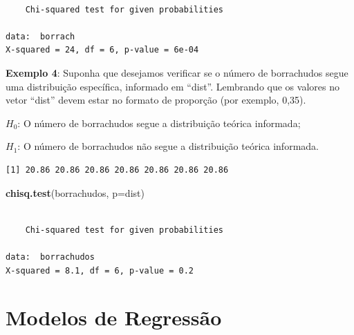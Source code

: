 \documentclass[12pt,brazil,oneside]{book}
\newenvironment{Shaded}{\begin{snugshade}}{\end{snugshade}}
\newcommand{\DataTypeTok}[1]{\textcolor[rgb]{0.13,0.29,0.53}{#1}}
\newcommand{\DecValTok}[1]{\textcolor[rgb]{0.00,0.00,0.81}{#1}}
\newcommand{\FloatTok}[1]{\textcolor[rgb]{0.00,0.00,0.81}{#1}}
\newcommand{\KeywordTok}[1]{\textcolor[rgb]{0.13,0.29,0.53}{\textbf{#1}}}
\newcommand{\NormalTok}[1]{#1}
\newcommand{\OperatorTok}[1]{\textcolor[rgb]{0.81,0.36,0.00}{\textbf{#1}}}
\begin{document}
\begin{verbatim}

    Chi-squared test for given probabilities

data:  borrach
X-squared = 24, df = 6, p-value = 6e-04
\end{verbatim}

\textbf{Exemplo 4}: Suponha que desejamos verificar se o número de borrachudos segue uma distribuição específica, informado em ``dist''. Lembrando que os valores no vetor ``dist'' devem estar no formato de proporção (por exemplo, 0,35).

\(H_0\): O número de borrachudos segue a distribuição teórica informada;

\(H_1\): O número de borrachudos não segue a distribuição teórica informada.

\begin{Shaded}
\end{Shaded}

\begin{verbatim}
[1] 20.86 20.86 20.86 20.86 20.86 20.86 20.86
\end{verbatim}

\begin{Shaded}
\begin{Highlighting}[]
\KeywordTok{chisq.test}\NormalTok{(borrachudos, }\DataTypeTok{p=}\NormalTok{dist)}
\end{Highlighting}
\end{Shaded}

\begin{verbatim}

    Chi-squared test for given probabilities

data:  borrachudos
X-squared = 8.1, df = 6, p-value = 0.2
\end{verbatim}

\hypertarget{reg}{%
\chapter{Modelos de Regressão}\label{reg}}
\end{document}
